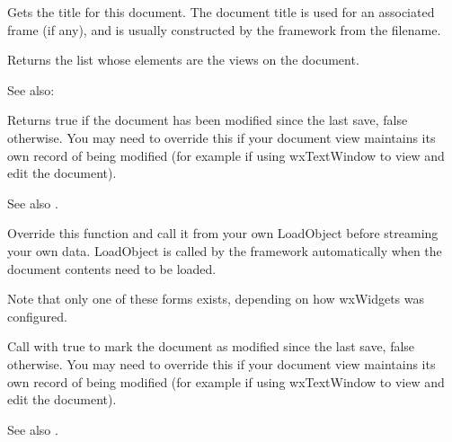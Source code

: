 


Gets the title for this document. The document title is used for an associated
frame (if any), and is usually constructed by the framework from
the filename.

\label{wxdocumentgetviews}


Returns the list whose elements are the views on the document.

See also: 

\label{wxdocumentismodified}


Returns true if the document has been modified since the last save, false otherwise.
You may need to override this if your document view maintains its own
record of being modified (for example if using wxTextWindow to view and edit the document).

See also .




Override this function and call it from your own LoadObject before
streaming your own data. LoadObject is called by the framework
automatically when the document contents need to be loaded.

Note that only one of these forms exists, depending on how wxWidgets
was configured.

\label{wxdocumentmodify}


Call with true to mark the document as modified since the last save, false otherwise.
You may need to override this if your document view maintains its own
record of being modified (for example if using wxTextWindow to view and edit the document).

See also .

